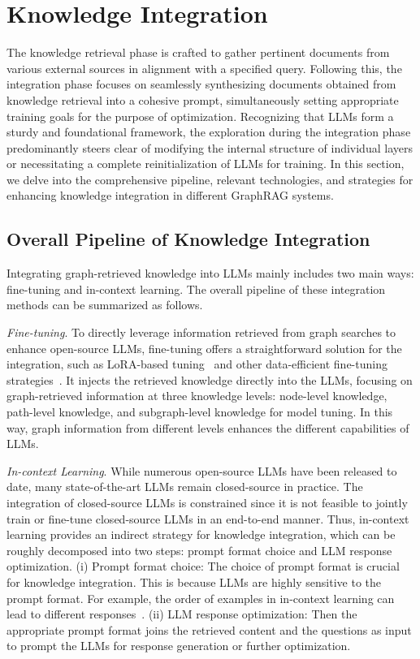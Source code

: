 \documentclass[lettersize,journal]{IEEEtran}
\begin{document}
\section{Knowledge Integration}\label{sec:integration}
The knowledge retrieval phase is crafted to gather pertinent documents from various external sources in alignment with a specified query. Following this, the integration phase focuses on seamlessly synthesizing documents obtained from knowledge retrieval into a cohesive prompt, simultaneously setting appropriate training goals for the purpose of optimization. Recognizing that LLMs form a sturdy and foundational framework, the exploration during the integration phase predominantly steers clear of modifying the internal structure of individual layers or necessitating a complete reinitialization of LLMs for training. In this section, we delve into the comprehensive pipeline, relevant technologies, and strategies for enhancing knowledge integration in different GraphRAG systems.



\subsection{Overall Pipeline of Knowledge Integration}
Integrating graph-retrieved knowledge into LLMs mainly includes two main ways: fine-tuning and in-context learning. The overall pipeline of these integration methods can be summarized as follows.

\textit{Fine-tuning}. To directly leverage information retrieved from graph searches to enhance open-source LLMs, fine-tuning offers a straightforward solution for the integration, such as LoRA-based tuning~\cite{hu2022lora,li2024loftq} and other data-efficient fine-tuning strategies~\cite{hu2023llm,lin2024data}. It injects the retrieved knowledge directly into the LLMs, focusing on graph-retrieved information at three knowledge levels: node-level knowledge, path-level knowledge, and subgraph-level knowledge for model tuning. In this way, graph information from different levels enhances the different capabilities of LLMs.


\textit{In-context Learning}. While numerous open-source LLMs have been released to date, many state-of-the-art LLMs remain closed-source in practice. 
The integration of closed-source LLMs is constrained since it is not feasible to jointly train or fine-tune closed-source LLMs in an end-to-end manner. 
Thus, in-context learning provides an indirect strategy for knowledge integration, which can be roughly decomposed into two steps: prompt format choice and LLM response optimization.
(i) Prompt format choice: 
The choice of prompt format is crucial for knowledge integration. This is because LLMs are highly sensitive to the prompt format. For example, the order of examples in in-context learning can lead to different responses~\cite{he2024does,arawjo2024chainforge}.
(ii) LLM response optimization: Then the appropriate prompt format joins the retrieved content and the questions as input to prompt the LLMs for response generation or further optimization. 
\end{document}
